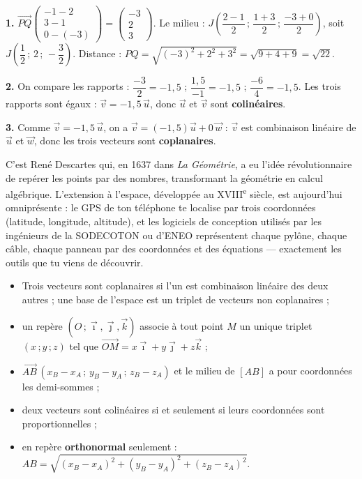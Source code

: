 \documentclass[11pt]{article}
\newcommand{\cle}[1]{{\popxbold\color{popdark}#1}}
\begin{document}
\begin{corrige}[Exercice 1]
\textbf{1.} $\overrightarrow{PQ}\begin{pmatrix} -1-2 \\ 3-1 \\ 0-(-3) \end{pmatrix} = \begin{pmatrix} -3 \\ 2 \\ 3 \end{pmatrix}$. Le milieu : $J\left(\dfrac{2-1}{2}\,;\,\dfrac{1+3}{2}\,;\,\dfrac{-3+0}{2}\right)$, soit $J\left(\dfrac{1}{2}\,;\,2\,;\,-\dfrac{3}{2}\right)$. Distance : $PQ=\sqrt{(-3)^2+2^2+3^2}=\sqrt{9+4+9}=\sqrt{22}$.

\textbf{2.} On compare les rapports : $\dfrac{-3}{2}=-1{,}5$ ; $\dfrac{1{,}5}{-1}=-1{,}5$ ; $\dfrac{-6}{4}=-1{,}5$. Les trois rapports sont égaux : $\vec{v}=-1{,}5\,\vec{u}$, donc $\vec{u}$ et $\vec{v}$ sont \textbf{colinéaires}.

\textbf{3.} Comme $\vec{v}=-1{,}5\,\vec{u}$, on a $\vec{v}=(-1{,}5)\vec{u}+0\,\vec{w}$ : $\vec{v}$ est combinaison linéaire de $\vec{u}$ et $\vec{w}$, donc les trois vecteurs sont \textbf{coplanaires}.
\end{corrige}

\begin{savaistu}
C'est René Descartes qui, en 1637 dans \emph{La Géométrie}, a eu l'idée révolutionnaire de repérer les points par des nombres, transformant la géométrie en calcul algébrique. L'extension à l'espace, développée au XVIII\textsuperscript{e} siècle, est aujourd'hui omniprésente : le GPS de ton téléphone te localise par trois coordonnées (latitude, longitude, altitude), et les logiciels de conception utilisés par les ingénieurs de la SODECOTON ou d'ENEO représentent chaque pylône, chaque câble, chaque panneau par des coordonnées et des équations — exactement les outils que tu viens de découvrir.
\end{savaistu}

\begin{aretenir}
\begin{itemize}
\item Trois vecteurs sont \cle{coplanaires} si l'un est combinaison linéaire des deux autres ; une \cle{base} de l'espace est un triplet de vecteurs non coplanaires ;
\item un \cle{repère} $(O\,;\vec{\imath},\vec{\jmath},\vec{k})$ associe à tout point $M$ un unique triplet $(x\,;y\,;z)$ tel que $\overrightarrow{OM}=x\vec{\imath}+y\vec{\jmath}+z\vec{k}$ ;
\item $\overrightarrow{AB}\,(x_B-x_A\,;\,y_B-y_A\,;\,z_B-z_A)$ et le milieu de $[AB]$ a pour coordonnées les demi-sommes ;
\item deux vecteurs sont colinéaires si et seulement si leurs coordonnées sont proportionnelles ;
\item en repère \textbf{orthonormal} seulement : $AB=\sqrt{(x_B-x_A)^2+(y_B-y_A)^2+(z_B-z_A)^2}$.
\end{itemize}
\end{aretenir}
\end{document}
